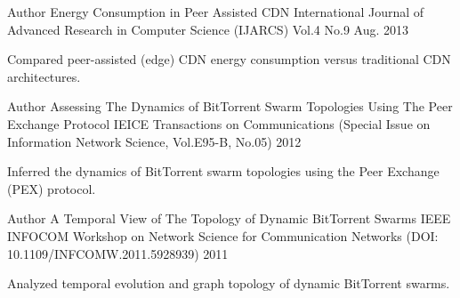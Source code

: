 

\begin{cventries}

  \cventry
    {Author} %
    {Energy Consumption in Peer Assisted CDN} %
    {International Journal of Advanced Research in Computer Science (IJARCS) Vol.4 No.9} %
    {Aug. 2013} %
    {
      \begin{cvitems} %
        \item {Compared peer-assisted (edge) CDN energy consumption versus traditional CDN architectures.}
      \end{cvitems}
    }

  \cventry
    {Author} %
    {Assessing The Dynamics of BitTorrent Swarm Topologies Using The Peer Exchange Protocol} %
    {IEICE Transactions on Communications (Special Issue on Information Network Science, Vol.E95-B, No.05)} %
    {2012} %
    {
      \begin{cvitems} %
        \item {Inferred the dynamics of BitTorrent swarm topologies using the Peer Exchange (PEX) protocol.}
      \end{cvitems}
    }

  \cventry
    {Author} %
    {A Temporal View of The Topology of Dynamic BitTorrent Swarms} %
    {IEEE INFOCOM Workshop on Network Science for Communication Networks (DOI: 10.1109/INFCOMW.2011.5928939)} %
    {2011} %
    {
      \begin{cvitems} %
        \item {Analyzed temporal evolution and graph topology of dynamic BitTorrent swarms.}
      \end{cvitems}
    }

\end{cventries}
